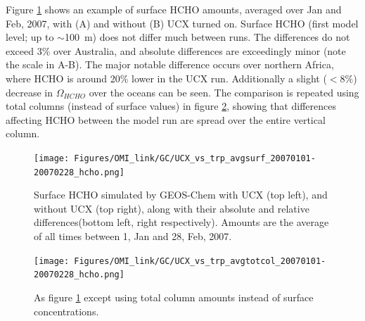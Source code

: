       Figure \ref{Model:GC:simulation:comparison:fig_UCXvsTrop_HCHO_surf_fullday} shows an example of surface HCHO amounts, averaged over Jan and Feb, 2007, with (A) and without (B) UCX turned on.
      Surface HCHO (first model level; up to $\sim$100~m) does not differ much between runs.
      The differences do not exceed 3\% over Australia, and absolute differences are exceedingly minor (note the scale in A-B).
      The major notable difference occurs over northern Africa, where HCHO is around 20\% lower in the UCX run.
      Additionally a slight ($<8\%$) decrease in $\Omega_{HCHO}$ over the oceans can be seen.
      The comparison is repeated using total columns (instead of surface values) in figure \ref{Model:GC:simulation:comparison:fig_UCXvsTrop_HCHO_totcol_fullday}, showing that differences affecting HCHO between the model run are spread over the entire vertical column.
      
      
      \begin{figure}
        \texttt{[image: Figures/OMI\_link/GC/UCX\_vs\_trp\_avgsurf\_20070101-20070228\_hcho.png]}
        \caption{%
          Surface HCHO simulated by GEOS-Chem with UCX (top left), and without UCX (top right), along with their absolute and relative differences(bottom left, right respectively).
          Amounts are the average of all times between 1, Jan and 28, Feb, 2007.
        }
        \label{Model:GC:simulation:comparison:fig_UCXvsTrop_HCHO_surf_fullday}
      \end{figure}
      
      \begin{figure}
        \texttt{[image: Figures/OMI\_link/GC/UCX\_vs\_trp\_avgtotcol\_20070101-20070228\_hcho.png]}
        \caption{%
          As figure \ref{Model:GC:simulation:comparison:fig_UCXvsTrop_HCHO_surf_fullday} except using total column amounts instead of surface concentrations.
        }
        \label{Model:GC:simulation:comparison:fig_UCXvsTrop_HCHO_totcol_fullday}
      \end{figure}
      

      
